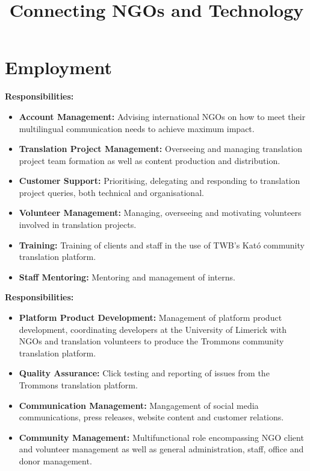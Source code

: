 \documentclass[a4paper,11pt]{moderncv}
\title{Connecting NGOs and Technology}
\begin{document}
\maketitle

\section{Employment}

{
  \textbf{Responsibilities:}
  \begin{itemize}
  \item \textbf{Account Management:} Advising international NGOs on how to meet their multilingual communication needs to achieve maximum impact.
  \item \textbf{Translation Project Management:} Overseeing and managing translation project team formation as well as content production and distribution.
  \item \textbf{Customer Support:} Prioritising, delegating and responding to translation project queries, both technical and organisational.
  \item \textbf{Volunteer Management:} Managing, overseeing and motivating volunteers involved in translation projects.
  \item \textbf{Training:} Training of clients and staff in the use of TWB's Kató community translation platform.
  \item \textbf{Staff Mentoring:} Mentoring and management of interns.
  \end{itemize}
}

{
  \textbf{Responsibilities:}
  \begin{itemize}
  \item \textbf{Platform Product Development:} Management of platform product development, coordinating developers at the University of Limerick with NGOs and translation volunteers to produce the Trommons community translation platform.
  \item \textbf{Quality Assurance:} Click testing and reporting of issues from the Trommons translation platform.
  \item \textbf{Communication Management:} Mangagement of social media communications, press releases, website content and customer relations.
  \item \textbf{Community Management:} Multifunctional role encompassing NGO client and volunteer management as well as general administration, staff, office and donor management.
  \end{itemize}
}
\end{document}
